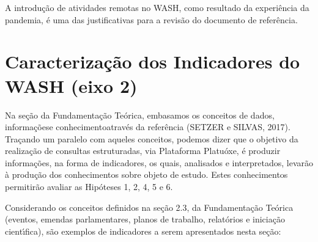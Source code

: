 \documentclass[
12pt,		%
openright,	%
twoside,  %
a4paper,			%
chapter=TITLE,		%
english,			%
french,				%
spanish,			%
brazil				%
]{USPSC-classe/USPSC}
\begin{document}
A introdu\c{c}\~ao de atividades remotas no WASH, como resultado da experi\^encia da pandemia, \'e uma das justificativas para a revis\~ao do documento de refer\^encia.

















\section[Caracteriza\c{c}\~ao dos Indicadores do WASH (eixo 2)]{Caracteriza\c{c}\~ao dos Indicadores do WASH (eixo 2)}\label{Caracteriza\c{c}\~ao dos Indicadores do WASH (eixo 2)}
Na se\c{c}\~ao da Fundamenta\c{c}\~ao Te\'orica, embasamos os conceitos de \textquotedbl dados\textquotedbl , \textquotedbl informa\c{c}\~oes\textquotedbl  e \textquotedbl conhecimento\textquotedbl   atrav\'es da refer\^encia (SETZER  e SILVAS, 2017). Tra\c{c}ando um paralelo com aqueles conceitos, podemos dizer que o objetivo da realiza\c{c}\~ao de consultas estruturadas, via Plataforma \textquotedbl Platu\'oxe\textquotedbl , \'e produzir informa\c{c}\~oes, na forma de indicadores, os quais, analisados e interpretados, levar\~ao \`a produ\c{c}\~ao dos conhecimentos sobre objeto de estudo. Estes conhecimentos permitir\~ao avaliar as Hip\'oteses 1, 2, 4, 5 e 6.

















Considerando os conceitos definidos na se\c{c}\~ao 2.3, da Fundamenta\c{c}\~ao Te\'orica (eventos, emendas parlamentares, planos de trabalho, relat\'orios e inicia\c{c}\~ao cient\'{\i}fica), s\~ao exemplos de indicadores a serem apresentados nesta se\c{c}\~ao:
\end{document}
